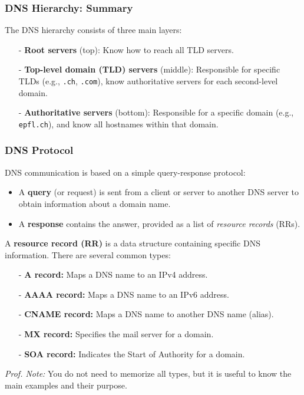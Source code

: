 \documentclass[../../compsys.tex]{subfiles}
\begin{document}
\subsubsection{DNS Hierarchy: Summary}
The DNS hierarchy consists of three main layers:
\begin{itemize}
    \item[-] \textbf{Root servers} (top): Know how to reach all TLD servers.
    \item[-] \textbf{Top-level domain (TLD) servers} (middle): Responsible for specific TLDs (e.g., \texttt{.ch}, \texttt{.com}), know authoritative servers for each second-level domain.
    \item[-] \textbf{Authoritative servers} (bottom): Responsible for a specific domain (e.g., \texttt{epfl.ch}), and know all hostnames within that domain.
\end{itemize}

\subsubsection{DNS Protocol}
DNS communication is based on a simple query-response protocol:
\begin{itemize}
    \item A \textbf{query} (or request) is sent from a client or server to another DNS server to obtain information about a domain name.
    \item A \textbf{response} contains the answer, provided as a list of \textit{resource records} (RRs).
\end{itemize}

A \textbf{resource record (RR)} is a data structure containing specific DNS information. There are several common types:
\begin{itemize}
    \item[-] \textbf{A record:} Maps a DNS name to an IPv4 address.
    \item[-] \textbf{AAAA record:} Maps a DNS name to an IPv6 address.
    \item[-] \textbf{CNAME record:} Maps a DNS name to another DNS name (alias).
    \item[-] \textbf{MX record:} Specifies the mail server for a domain.
    \item[-] \textbf{SOA record:} Indicates the Start of Authority for a domain.
\end{itemize}

\textit{Prof. Note:} You do not need to memorize all types, but it is useful to know the main examples and their purpose.
\end{document}

